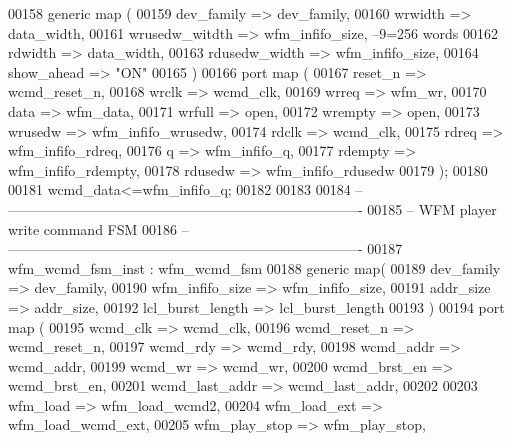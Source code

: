 \begin{DoxyCode}
00158 \textcolor{keywordflow}{generic} \textcolor{keywordflow}{map} (
00159         dev_family          => dev_family,
00160         wrwidth             => data_width,
00161         wrusedw_witdth      => wfm_infifo_size,\textcolor{keyword}{ --9=256 words }
00162         rdwidth             => data_width,
00163         rdusedw_width       => wfm_infifo_size,
00164         show_ahead          => \textcolor{keyword}{"ON"}
00165 \textcolor{vhdlchar}{)}
00166 \textcolor{keywordflow}{port} \textcolor{keywordflow}{map} (
00167       reset_n               => wcmd_reset_n, 
00168       wrclk                 => wcmd_clk, 
00169       wrreq                 => wfm_wr, 
00170       data                  => wfm_data, 
00171       wrfull                => \textcolor{keywordflow}{open}, 
00172         wrempty             => \textcolor{keywordflow}{open}, 
00173       wrusedw               => wfm_infifo_wrusedw, 
00174       rdclk                 => wcmd_clk, 
00175       rdreq                 => wfm_infifo_rdreq, 
00176       q                     => wfm_infifo_q, 
00177       rdempty           => wfm_infifo_rdempty, 
00178       rdusedw               => wfm_infifo_rdusedw   
00179 \textcolor{vhdlchar}{)};
00180 
00181 \textcolor{vhdlchar}{wcmd_data}\textcolor{vhdlchar}{<=}\textcolor{vhdlchar}{wfm_infifo_q};
00182 
00183 
00184 \textcolor{keyword}{-- ----------------------------------------------------------------------------}
00185 \textcolor{keyword}{-- WFM player write command FSM}
00186 \textcolor{keyword}{-- ----------------------------------------------------------------------------}
00187 wfm_wcmd_fsm_inst : wfm_wcmd_fsm 
00188     \textcolor{keywordflow}{generic} \textcolor{keywordflow}{map}(
00189         dev_family              => dev_family,  
00190         wfm_infifo_size     => wfm_infifo_size, 
00191         addr_size               => addr_size, 
00192         lcl_burst_length        => lcl_burst_length
00193 \textcolor{vhdlchar}{)}
00194     \textcolor{keywordflow}{port} \textcolor{keywordflow}{map} (
00195         wcmd_clk                    => wcmd_clk, 
00196         wcmd_reset_n            => wcmd_reset_n, 
00197         wcmd_rdy                    => wcmd_rdy, 
00198         wcmd_addr               => wcmd_addr, 
00199         wcmd_wr                 => wcmd_wr, 
00200         wcmd_brst_en            => wcmd_brst_en,
00201         wcmd_last_addr          => wcmd_last_addr,
00202 
00203         wfm_load                    => wfm_load_wcmd2,
00204         wfm_load_ext            => wfm_load_wcmd_ext, 
00205         wfm_play_stop           => wfm_play_stop, 

\end{DoxyCode}
